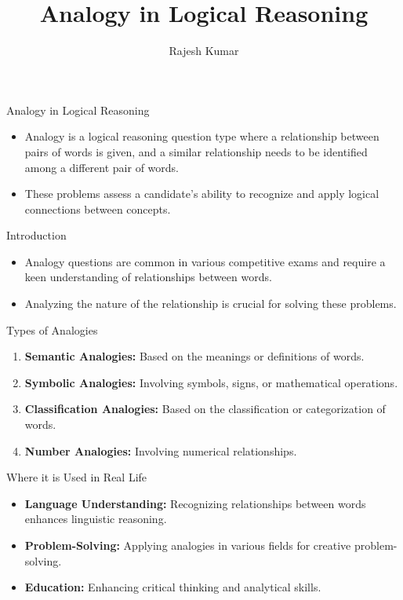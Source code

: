 \title{Analogy in Logical Reasoning}
\author{Rajesh Kumar}
\date{}

\begin{frame}
  \titlepage
\end{frame}

\begin{frame}{Analogy in Logical Reasoning}
  \begin{itemize}
    \item Analogy is a logical reasoning question type where a relationship between pairs of words is given, and a similar relationship needs to be identified among a different pair of words.
    \item These problems assess a candidate's ability to recognize and apply logical connections between concepts.
  \end{itemize}
\end{frame}

\begin{frame}{Introduction}
  \begin{itemize}
    \item Analogy questions are common in various competitive exams and require a keen understanding of relationships between words.
    \item Analyzing the nature of the relationship is crucial for solving these problems.
  \end{itemize}
\end{frame}

\begin{frame}{Types of Analogies}
  \begin{enumerate}
    \item \textbf{Semantic Analogies:} Based on the meanings or definitions of words.
    \item \textbf{Symbolic Analogies:} Involving symbols, signs, or mathematical operations.
    \item \textbf{Classification Analogies:} Based on the classification or categorization of words.
    \item \textbf{Number Analogies:} Involving numerical relationships.
  \end{enumerate}
\end{frame}

\begin{frame}{Where it is Used in Real Life}
  \begin{itemize}
    \item \textbf{Language Understanding:} Recognizing relationships between words enhances linguistic reasoning.
    \item \textbf{Problem-Solving:} Applying analogies in various fields for creative problem-solving.
    \item \textbf{Education:} Enhancing critical thinking and analytical skills.
  \end{itemize}
\end{frame}

